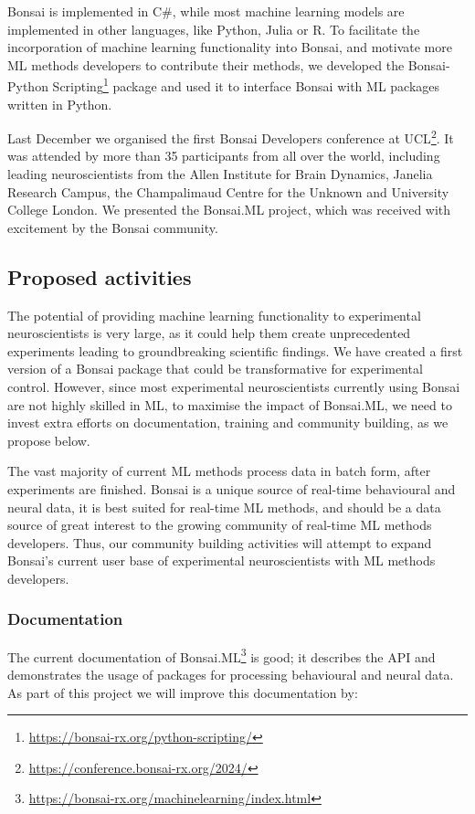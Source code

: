 Bonsai is implemented in C\#, while most machine learning models are
implemented in other languages, like Python, Julia or R.
%
To facilitate the incorporation of machine learning functionality into Bonsai,
and motivate more ML methods developers to contribute their methods, we
developed the Bonsai-Python
Scripting\footnote[6]{\url{https://bonsai-rx.org/python-scripting/}}
package and used it to interface Bonsai with ML packages written in Python.

Last December we organised the first Bonsai Developers conference at
UCL\footnote[7]{\url{https://conference.bonsai-rx.org/2024/}}. It was attended by more
than 35 participants from all over the world, including leading neuroscientists
from the Allen Institute for Brain Dynamics, Janelia Research Campus, the
Champalimaud Centre for the Unknown and University College London. We presented
the Bonsai.ML project, which was received with excitement by the Bonsai
community.

\subsection*{Proposed activities}

The potential of providing machine learning functionality to experimental
neuroscientists is very large, as it could help them create unprecedented
experiments leading to groundbreaking scientific findings.
%
We have created a first version of a Bonsai package that could be
transformative for experimental control.
%
However, since most experimental neuroscientists currently using Bonsai are not
highly skilled in ML, to maximise the impact of Bonsai.ML, we need to invest
extra efforts on documentation, training and community building, as we propose
below.

The vast majority of current ML methods process data in batch form, after
experiments are finished. Bonsai is a unique source of real-time behavioural and
neural data, it is best suited for real-time ML methods, and should be a data
source of great interest to the growing community of real-time ML methods
developers. Thus, our community building activities will attempt to expand
Bonsai's current user base of experimental neuroscientists with ML methods
developers.

\subsubsection*{Documentation}

The current documentation of
Bonsai.ML\footnote[8]{\url{https://bonsai-rx.org/machinelearning/index.html}}
is good; it describes the API and demonstrates the usage of packages for
processing behavioural and neural data. As part of this project we will improve
this documentation by:


